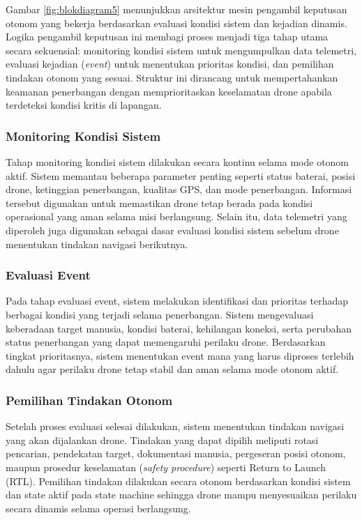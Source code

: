 Gambar \ref{fig:blokdiagram5} menunjukkan arsitektur mesin pengambil keputusan otonom yang bekerja berdasarkan evaluasi kondisi sistem dan kejadian dinamis. Logika pengambil keputusan ini membagi proses menjadi tiga tahap utama secara sekuensial: monitoring kondisi sistem untuk mengumpulkan data telemetri, evaluasi kejadian (\textit{event}) untuk menentukan prioritas kondisi, dan pemilihan tindakan otonom yang sesuai. Struktur ini dirancang untuk mempertahankan keamanan penerbangan dengan memprioritaskan keselamatan drone apabila terdeteksi kondisi kritis di lapangan.

\subsubsection{Monitoring Kondisi Sistem}
Tahap monitoring kondisi sistem dilakukan secara kontinu selama mode otonom aktif. Sistem memantau beberapa parameter penting seperti status baterai, posisi drone, ketinggian penerbangan, kualitas GPS, dan mode penerbangan. Informasi tersebut digunakan untuk memastikan drone tetap berada pada kondisi operasional yang aman selama misi berlangsung. Selain itu, data telemetri yang diperoleh juga digunakan sebagai dasar evaluasi kondisi sistem sebelum drone menentukan tindakan navigasi berikutnya.

\subsubsection{Evaluasi Event}
Pada tahap evaluasi event, sistem melakukan identifikasi dan prioritas terhadap berbagai kondisi yang terjadi selama penerbangan. Sistem mengevaluasi keberadaan target manusia, kondisi baterai, kehilangan koneksi, serta perubahan status penerbangan yang dapat memengaruhi perilaku drone. Berdasarkan tingkat prioritasnya, sistem menentukan event mana yang harus diproses terlebih dahulu agar perilaku drone tetap stabil dan aman selama mode otonom aktif.

\subsubsection{Pemilihan Tindakan Otonom}
Setelah proses evaluasi selesai dilakukan, sistem menentukan tindakan navigasi yang akan dijalankan drone. Tindakan yang dapat dipilih meliputi rotasi pencarian, pendekatan target, dokumentasi manusia, pergeseran posisi otonom, maupun prosedur keselamatan (\textit{safety procedure}) seperti Return to Launch (RTL). Pemilihan tindakan dilakukan secara otonom berdasarkan kondisi sistem dan state aktif pada state machine sehingga drone mampu menyesuaikan perilaku secara dinamis selama operasi berlangsung.

